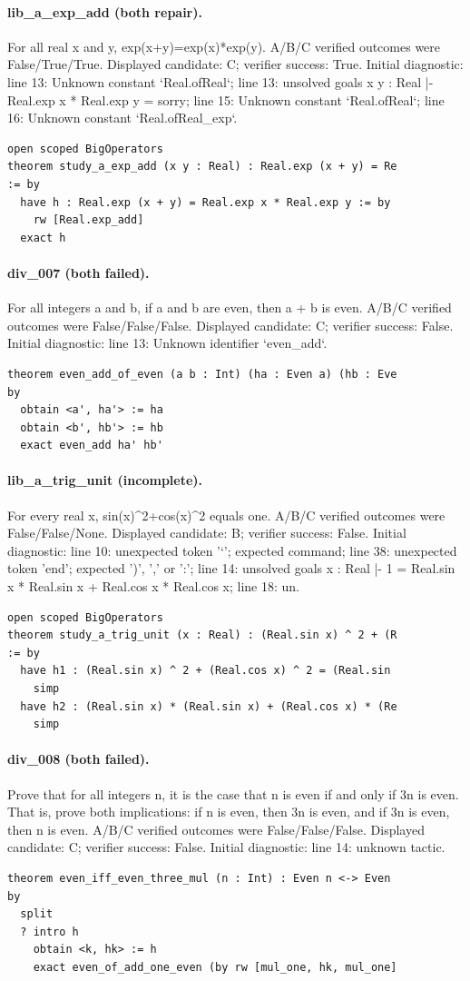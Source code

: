 \paragraph{lib\_a\_exp\_add (both repair).}
For all real x and y, exp(x+y)=exp(x)*exp(y). A/B/C verified outcomes were False/True/True.
Displayed candidate: C; verifier success: True.
Initial diagnostic: line 13: Unknown constant `Real.ofReal`; line 13: unsolved goals
x y : Real
|- Real.exp x * Real.exp y = sorry; line 15: Unknown constant `Real.ofReal`; line 16: Unknown constant `Real.ofReal\_exp`.
\begin{verbatim}
open scoped BigOperators
theorem study_a_exp_add (x y : Real) : Real.exp (x + y) = Re
:= by
  have h : Real.exp (x + y) = Real.exp x * Real.exp y := by
    rw [Real.exp_add]
  exact h
\end{verbatim}
\paragraph{div\_007 (both failed).}
For all integers a and b, if a and b are even, then a + b is even. A/B/C verified outcomes were False/False/False.
Displayed candidate: C; verifier success: False.
Initial diagnostic: line 13: Unknown identifier `even\_add`.
\begin{verbatim}
theorem even_add_of_even (a b : Int) (ha : Even a) (hb : Eve
by
  obtain <a', ha'> := ha
  obtain <b', hb'> := hb
  exact even_add ha' hb'
\end{verbatim}
\paragraph{lib\_a\_trig\_unit (incomplete).}
For every real x, sin(x)\textasciicircum{}2+cos(x)\textasciicircum{}2 equals one. A/B/C verified outcomes were False/False/None.
Displayed candidate: B; verifier success: False.
Initial diagnostic: line 10: unexpected token '`'; expected command; line 38: unexpected token 'end'; expected ')', ',' or ':'; line 14: unsolved goals
x : Real
|- 1 = Real.sin x * Real.sin x + Real.cos x * Real.cos x; line 18: un.
\begin{verbatim}
open scoped BigOperators
theorem study_a_trig_unit (x : Real) : (Real.sin x) ^ 2 + (R
:= by
  have h1 : (Real.sin x) ^ 2 + (Real.cos x) ^ 2 = (Real.sin
    simp
  have h2 : (Real.sin x) * (Real.sin x) + (Real.cos x) * (Re
    simp
\end{verbatim}
\paragraph{div\_008 (both failed).}
Prove that for all integers n, it is the case that n is even if and only if 3n is even. That is, prove both implications: if n is even, then 3n is even, and if 3n is even, then n is even. A/B/C verified outcomes were False/False/False.
Displayed candidate: C; verifier success: False.
Initial diagnostic: line 14: unknown tactic.
\begin{verbatim}
theorem even_iff_even_three_mul (n : Int) : Even n <-> Even
by
  split
  ? intro h
    obtain <k, hk> := h
    exact even_of_add_one_even (by rw [mul_one, hk, mul_one]

\end{verbatim}
